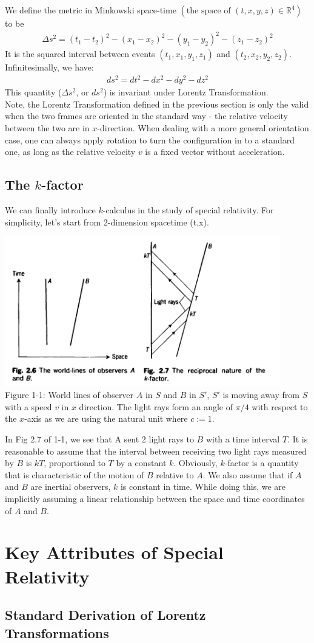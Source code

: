 \documentclass[9pt,oneside,headheight=10mm]{book}
\newcommand{\cb}[1]{\left(#1\right)}
\begin{document}
	We define the metric in Minkowski space-time $\cb{\text{the space of } (t,x,y,z)\in\mathbb{R}^4}$ to be
	\begin{align*}
	\Delta s^2 = (t_1-t_2)^2 - (x_1-x_2)^2 - (y_1-y_2)^2 - (z_1-z_2)^2
	\end{align*}
	It is the squared interval between events $(t_1, x_1, y_1, z_1)$ and $(t_2, x_2, y_2, z_2)$. Infinitesimally, we have:
	\begin{align*}
	ds^2 = dt^2 - dx^2 - dy^2-dz^2
	\end{align*}
	This quantity ($\Delta s^2$, or $ds^2$) is invariant under Lorentz Transformation.\\
	Note, the Lorentz Transformation defined in the previous section is only the valid when the two frames are oriented in the standard way - the relative velocity between the two are in $x$-direction. When dealing with a more general orientation case, one can always apply rotation to turn the configuration in to a standard one, as long as the relative velocity $v$ is a fixed vector without acceleration.
	
	\section{The $k$-factor}
	We can finally introduce $k$-calculus in the study of special relativity. For simplicity, let's start from 2-dimension spacetime (t,x).
	\begin{center}
	\includegraphics[width=12cm]{Chap1/1-1}\\
	Figure 1-1: World lines of observer $A$ in $S$ and $B$ in $S'$, $S'$ is moving away from $S$ with a speed $v$ in $x$ direction. The light rays form an angle of $\pi/4$ with respect to the $x$-axis as we are using the natural unit where $c:=1$.
	\end{center}
	In Fig 2.7 of 1-1, we see that A sent 2 light rays to $B$ with a time interval $T$. It is reasonable to assume that the interval between receiving two light rays measured by $B$ is $kT$, proportional to $T$ by a constant $k$. Obviously, $k$-factor is a quantity that is characteristic of the motion of $B$ relative to $A$. We also assume that if $A$ and $B$ are inertial observers, $k$ is constant in time. While doing this, we are implicitly assuming a linear relationship between the space and time coordinates of $A$ and $B$.
	
	
	\chapter{Key Attributes of Special Relativity}
	\section{Standard Derivation of Lorentz Transformations}
	
	
\end{document}
